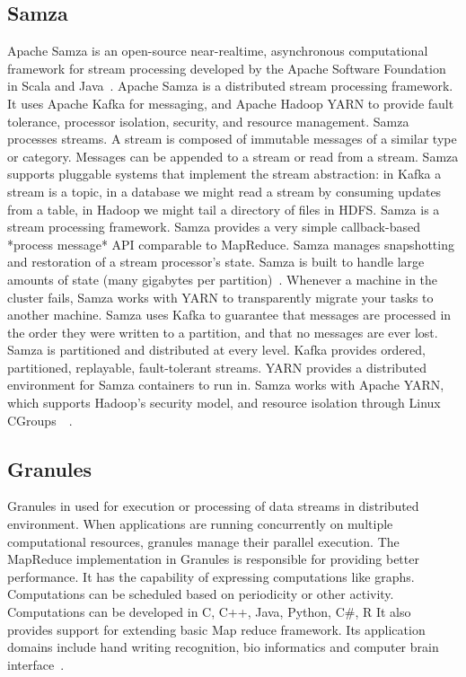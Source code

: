      \pv


     
\subsection{Samza}

Apache Samza is an open-source near-realtime, asynchronous
computational framework for stream processing developed by the Apache
Software Foundation in Scala and Java~\cite{www-samza-3}.  Apache
Samza is a distributed stream processing framework. It uses Apache
Kafka for messaging, and Apache Hadoop YARN to provide fault
tolerance, processor isolation, security, and resource
management. Samza processes streams. A stream is composed of immutable
messages of a similar type or category. Messages can be appended to a
stream or read from a stream.  Samza supports pluggable systems that
implement the stream abstraction: in Kafka a stream is a topic, in a
database we might read a stream by consuming updates from a table, in
Hadoop we might tail a directory of files in HDFS. Samza is a stream
processing framework. Samza provides a very simple callback-based
*process message* API comparable to MapReduce.  Samza manages
snapshotting and restoration of a stream processor’s state.  Samza is
built to handle large amounts of state (many gigabytes per
partition)~\cite{www-samza-1}.  Whenever a machine in the cluster
fails, Samza works with YARN to transparently migrate your tasks to
another machine. Samza uses Kafka to guarantee that messages are
processed in the order they were written to a partition, and that no
messages are ever lost.  Samza is partitioned and distributed at every
level. Kafka provides ordered, partitioned, replayable, fault-tolerant
streams. YARN provides a distributed environment for Samza containers
to run in. Samza works with Apache YARN, which supports Hadoop’s
security model, and resource isolation through Linux
CGroups~\cite{www-samza-4}~\cite{www-samza-3}.

\subsection{Granules}

Granules in used for execution or processing of data streams in
distributed environment.  When applications are running concurrently
on multiple computational resources, granules manage their parallel
execution.  The MapReduce implementation in Granules is responsible
for providing better performance. It has the capability of expressing
computations like graphs.  Computations can be scheduled based on
periodicity or other activity.  Computations can be developed in C,
C++, Java, Python, C\#, R It also provides support for extending basic
Map reduce framework.  Its application domains include hand writing
recognition, bio informatics and computer brain
interface~\cite{www-granules}.

